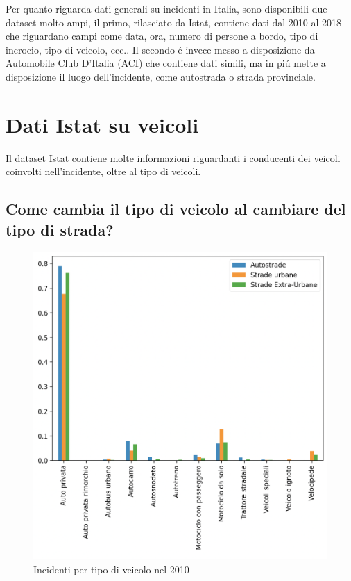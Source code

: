 \documentclass[a4paper]{report}
\begin{document}
Per quanto riguarda dati generali su incidenti in Italia, sono disponibili due dataset molto ampi, 
il primo, rilasciato da Istat, contiene dati dal 2010 al 2018 che riguardano campi come data, ora, 
numero di persone a bordo, tipo di incrocio, tipo di veicolo, ecc..
Il secondo \'e invece messo a disposizione da Automobile Club D'Italia (ACI) che contiene dati simili, 
ma in pi\'u mette a disposizione il luogo dell'incidente, come autostrada o strada provinciale.

\clearpage
\section{Dati Istat su veicoli}

Il dataset Istat contiene molte informazioni riguardanti i conducenti dei veicoli coinvolti 
nell'incidente, oltre al tipo di veicoli.

\clearpage
\subsection{Come cambia il tipo di veicolo al cambiare del tipo di strada?}

\begin{figure}[!ht]
    \includegraphics[width=\linewidth]{../src/incidenti/incidenti_senza_coords/tipo_veicoli/differenza_strade.png}
    \caption{Incidenti per tipo di veicolo nel 2010}
    \label{fig:differenza_strade}
\end{figure}
\end{document}
